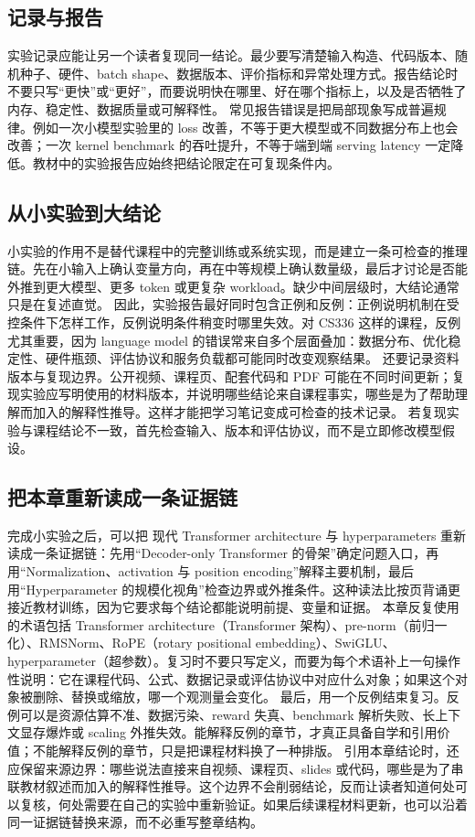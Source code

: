 \documentclass[a4paper]{article}
\begin{document}
\subsection{记录与报告}
实验记录应能让另一个读者复现同一结论。最少要写清楚输入构造、代码版本、随机种子、硬件、batch shape、数据版本、评价指标和异常处理方式。报告结论时不要只写“更快”或“更好”，而要说明快在哪里、好在哪个指标上，以及是否牺牲了内存、稳定性、数据质量或可解释性。
常见报告错误是把局部现象写成普遍规律。例如一次小模型实验里的 loss 改善，不等于更大模型或不同数据分布上也会改善；一次 kernel benchmark 的吞吐提升，不等于端到端 serving latency 一定降低。教材中的实验报告应始终把结论限定在可复现条件内。
\subsection{从小实验到大结论}
小实验的作用不是替代课程中的完整训练或系统实现，而是建立一条可检查的推理链。先在小输入上确认变量方向，再在中等规模上确认数量级，最后才讨论是否能外推到更大模型、更多 token 或更复杂 workload。缺少中间层级时，大结论通常只是在复述直觉。
因此，实验报告最好同时包含正例和反例：正例说明机制在受控条件下怎样工作，反例说明条件稍变时哪里失效。对 CS336 这样的课程，反例尤其重要，因为 language model 的错误常来自多个层面叠加：数据分布、优化稳定性、硬件瓶颈、评估协议和服务负载都可能同时改变观察结果。
还要记录资料版本与复现边界。公开视频、课程页、配套代码和 PDF 可能在不同时间更新；复现实验应写明使用的材料版本，并说明哪些结论来自课程事实，哪些是为了帮助理解而加入的解释性推导。这样才能把学习笔记变成可检查的技术记录。
若复现实验与课程结论不一致，首先检查输入、版本和评估协议，而不是立即修改模型假设。
\subsection{把本章重新读成一条证据链}
完成小实验之后，可以把 现代 Transformer architecture 与 hyperparameters 重新读成一条证据链：先用“Decoder-only Transformer 的骨架”确定问题入口，再用“Normalization、activation 与 position encoding”解释主要机制，最后用“Hyperparameter 的规模化视角”检查边界或外推条件。这种读法比按页背诵更接近教材训练，因为它要求每个结论都能说明前提、变量和证据。
本章反复使用的术语包括 Transformer architecture（Transformer 架构）、pre-norm（前归一化）、RMSNorm、RoPE（rotary positional embedding）、SwiGLU、hyperparameter（超参数）。复习时不要只写定义，而要为每个术语补上一句操作性说明：它在课程代码、公式、数据记录或评估协议中对应什么对象；如果这个对象被删除、替换或缩放，哪一个观测量会变化。
最后，用一个反例结束复习。反例可以是资源估算不准、数据污染、reward 失真、benchmark 解析失败、长上下文显存爆炸或 scaling 外推失效。能解释反例的章节，才真正具备自学和引用价值；不能解释反例的章节，只是把课程材料换了一种排版。
引用本章结论时，还应保留来源边界：哪些说法直接来自视频、课程页、slides 或代码，哪些是为了串联教材叙述而加入的解释性推导。这个边界不会削弱结论，反而让读者知道何处可以复核，何处需要在自己的实验中重新验证。如果后续课程材料更新，也可以沿着同一证据链替换来源，而不必重写整章结构。
\end{document}
